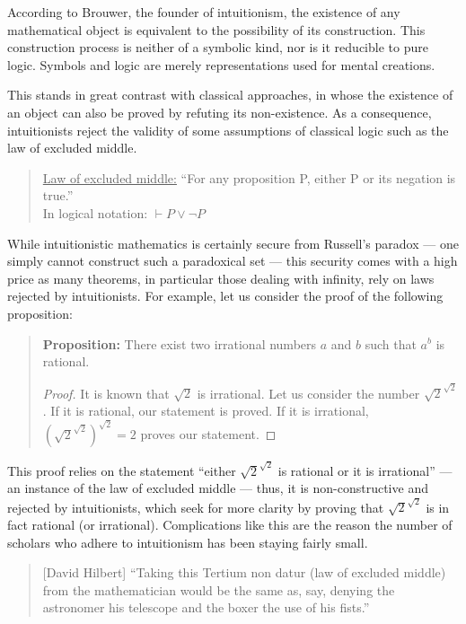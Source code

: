 \documentclass[hidelinks]{article}
\begin{document}
According to Brouwer, the founder of intuitionism, the existence of any mathematical object is equivalent to the possibility of its construction. 
This construction process is neither of a symbolic kind, nor is it reducible to pure logic. Symbols and logic are merely representations used for mental creations. 

This stands in great contrast with classical approaches, in whose the existence of an object can also be proved by refuting its non-existence. As a consequence, intuitionists reject the validity of some assumptions of classical logic such as the law of excluded middle.
\begin{quote}
\underline{Law of excluded middle:} ``For any proposition P, either P or its negation is true.''\\ 
In logical notation: $\vdash P\lor\lnot P$
\end{quote}
While intuitionistic mathematics is certainly secure from Russell's paradox --- one simply cannot construct such a paradoxical set --- this security comes with a high price as many theorems, in particular those dealing with infinity, rely on laws rejected by intuitionists. For example, let us consider the proof of the following proposition:
\begin{quote}
\textbf{Proposition:} There exist two irrational numbers $a$ and $b$ such that $a^b$ is rational.
\vspace{-2em}
\begin{proof}
	It is known that $\sqrt{2}$ is irrational. Let us consider the number $\sqrt{2}^{\sqrt{2}}$. If it is rational, our statement is proved. If it is irrational, $(\sqrt{2}^{\sqrt{2}})^{\sqrt{2}}=2$ proves our statement.
\end{proof}
\end{quote}
This proof relies on the statement ``either $\sqrt{2}^{\sqrt{2}}$ is rational or it is irrational'' --- an instance of the law of excluded middle --- thus, it is non-constructive and rejected by intuitionists, which seek for more clarity by proving that $\sqrt{2}^{\sqrt{2}}$ is in fact rational (or irrational). Complications like this are the reason the number of scholars who adhere to intuitionism has been staying fairly small.

\begin{quote}[David Hilbert]
``Taking this Tertium non datur (law of excluded middle) from the mathematician would be the same as, say, denying the astronomer his telescope and the boxer the use of his fists.''\cite{hilbert_tertium_non_datur}
\end{quote}
\end{document}

